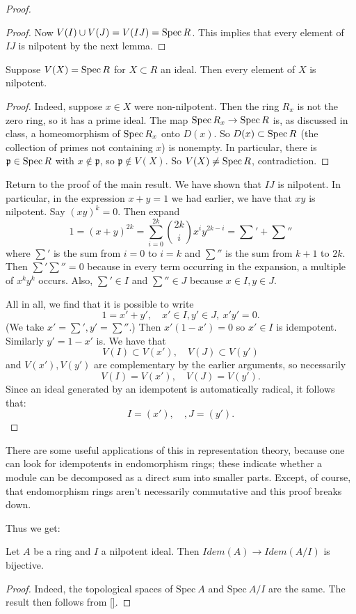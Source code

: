 \begin{proof}
\begin{proof}
Now $V(I) \cup V(J) = V(IJ) = \operatorname{Spec} R$. This implies that every element of
$IJ$  is nilpotent by the next lemma.
\end{proof}
\begin{lemma} 
Suppose $V(X)=\operatorname{Spec} R$ for $X \subset R$ an ideal. Then every element of $X$ is
nilpotent.
\end{lemma}
\begin{proof} 
Indeed, suppose $x \in X$ were non-nilpotent.  Then the ring $R_x$ is not the
zero ring, so it has a prime ideal. The map $\operatorname{Spec} R_x \to \operatorname{Spec} R$ is, as
discussed in class, a homeomorphism of $\operatorname{Spec} R_x$ onto $D(x)$.  So $D(x)
\subset \operatorname{Spec} R$ (the collection of primes not containing $x$) is nonempty. In
particular, there is $\mathfrak{p} \in \operatorname{Spec} R$ with $x \notin \mathfrak{p}$,
so $\mathfrak{p} \notin V(X)$. So $V(X) \neq \operatorname{Spec} R$, contradiction.
\end{proof} 

Return to the proof of the main result.  We have shown that $IJ$ is nilpotent.  
In particular, in the expression $x+y=1$ we had earlier, we have that $xy$ is
nilpotent.  Say $(xy)^k = 0$. Then expand
\[ 1 = (x+y)^{2k} = \sum_{i=0}^{2k} \binom{2k}{i}x^i y^{2k-i} = \sum' + \sum''  \]
where $\sum'$ is the sum from $i=0$ to $i=k$ and $\sum''$ is the sum from
$k+1$ to $2k$. Then $\sum' \sum'' = 0$ because in every term occurring in the
expansion, a multiple of $x^k y^k$ occurs. Also, $\sum' \in I$ and $\sum'' \in
J$ because $x \in I, y \in J$.

All in all, we find that it is possible to write
\[ 1 = x' + y', \quad x' \in I, y' \in J, \ x'y' = 0.  \]
(We take $x' = \sum', y' = \sum''$.)
Then $x'(1-x') = 0$ so $x' \in I$ is idempotent. Similarly $y' = 1-x'$ is. 
We have that 
\[ V(I) \subset V(x'), \quad V(J) \subset V(y')  \]
and $V(x'), V(y')$ are complementary by the earlier arguments, so necessarily
\[ V(I) = V(x'), \quad V(J) = V(y').  \]
Since an ideal generated by an idempotent is automatically radical, it follows
that:
\[ I = (x'), \quad, J = (y').  \]
\end{proof} 


There are some useful applications of this in representation theory, because
one can look for idempotents in endomorphism rings; these indicate whether a module can be decomposed as a direct sum into smaller parts.  Except, of course, that endomorphism rings aren't necessarily commutative and this proof breaks down.

Thus we get:
\begin{proposition} Let $A$ be a ring and $I$ a nilpotent ideal.  Then
$Idem(A) \to Idem(A/I)$ is bijective.
\end{proposition}
\begin{proof} 
Indeed, the topological spaces of $\mathrm{Spec} \   A$ and $\mathrm{Spec} \
A/I$ are the same.   The result then follows from \cref{}.
\end{proof} 



